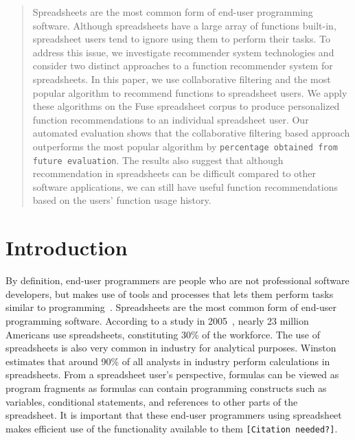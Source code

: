 \documentclass[conference]{IEEEtran}
\begin{document}
\begin{abstract}
Spreadsheets are the most common form of end-user programming software. Although spreadsheets have a large array of functions built-in, spreadsheet users tend to ignore using them to perform their tasks. To address this issue, we investigate recommender system technologies and consider two distinct approaches to a function recommender system for spreadsheets. In this paper, we use collaborative filtering and the most popular algorithm to recommend functions to spreadsheet users. We apply these algorithms on the Fuse spreadsheet corpus to produce personalized function recommendations to an individual spreadsheet user. Our automated evaluation shows that the collaborative filtering based approach outperforms the most popular algorithm by \texttt{percentage obtained from future evaluation}. The results also suggest that although recommendation in spreadsheets can be difficult compared to other software applications, we can still have useful function recommendations based on the users' function usage history.
\end{abstract}


%
\IEEEpeerreviewmaketitle

\section{Introduction}

By definition, end-user programmers are people who are not professional software developers, but makes use of tools and processes that lets them perform tasks similar to programming~\cite{ko2011state}. Spreadsheets are the most common form of  end-user programming software. According to a study in 2005~\cite{scaffidi2005estimating}, nearly 23 million Americans use spreadsheets, constituting 30\% of the workforce. The use of spreadsheets is also very common in industry for analytical purposes. Winston~\cite{winston2001executive} estimates that around 90\% of all analysts in industry perform calculations in spreadsheets. From a spreadsheet user's perspective, formulas can be viewed as program fragments as formulas can contain programming constructs such as variables, conditional statements, and references to other parts of the spreadsheet. It is important that these end-user programmers using spreadsheet makes efficient use of the functionality available to them \texttt{[Citation needed?]}.
\end{document}
